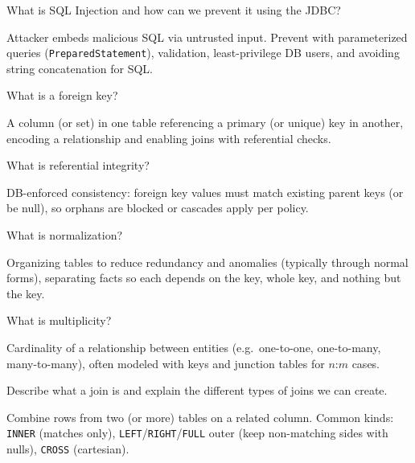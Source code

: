 \question[4]
What is SQL Injection and how can we prevent it using the JDBC?
\begin{solutionorbox}[1.45in]
  Attacker embeds malicious SQL via untrusted input. Prevent with parameterized queries (\texttt{PreparedStatement}), validation, least-privilege DB users, and avoiding string concatenation for SQL.
\end{solutionorbox}

\newpage


\question[4]
What is a foreign key?
\begin{solutionorbox}[1.1in]
  A column (or set) in one table referencing a primary (or unique) key in another, encoding a relationship and enabling joins with referential checks.
\end{solutionorbox}

\question[4]
What is referential integrity?
\begin{solutionorbox}[1.15in]
  DB-enforced consistency: foreign key values must match existing parent keys (or be null), so orphans are blocked or cascades apply per policy.
\end{solutionorbox}

\question[4]
What is normalization?
\begin{solutionorbox}[1.35in]
  Organizing tables to reduce redundancy and anomalies (typically through normal forms), separating facts so each depends on the key, whole key, and nothing but the key.
\end{solutionorbox}

\question[4]
What is multiplicity?
\begin{solutionorbox}[1.2in]
  Cardinality of a relationship between entities (e.g.\ one-to-one, one-to-many, many-to-many), often modeled with keys and junction tables for $n$:$m$ cases.
\end{solutionorbox}

\newpage


\question[4]
Describe what a join is and explain the different types of joins we can create.
\begin{solutionorbox}[1.65in]
  Combine rows from two (or more) tables on a related column. Common kinds: \texttt{INNER} (matches only), \texttt{LEFT}/\texttt{RIGHT}/\texttt{FULL} outer (keep non-matching sides with nulls), \texttt{CROSS} (cartesian).
\end{solutionorbox}


